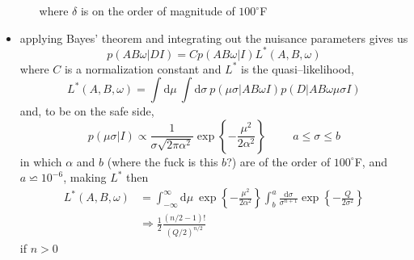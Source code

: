 \documentclass[../jaynes_prob_theory_notes.tex]{subfiles}
\begin{document}
\begin{itemize}
\begin{itemize}
                            where \(\delta\) is on the order of magnitude of \(100^{\circ}\)F
                    \end{itemize}
                \item applying Bayes' theorem and integrating out the nuisance parameters gives us
                    \begin{equation*} 
                        p(AB\omega|DI) = Cp(AB\omega|I)L^*(A, B, \omega)
                    \end{equation*}
                    where \(C\) is a normalization constant and \(L^*\) is the quasi--likelihood,
                    \begin{equation*} 
                        L^* (A,B,\omega) = \int \text{d}\mu~\int \text{d}\sigma~p(\mu\sigma|AB\omega I)p(D|AB\omega\mu\sigma I)
                    \end{equation*}
                    and, to be on the safe side,
                    \begin{equation*} 
                        p(\mu\sigma|I) \propto \frac{1}{\sigma \sqrt{2 \pi \alpha^2}} \exp \left \{ -\frac{\mu^2}{2 \alpha^2} \right \} \hspace{1cm} a \leq \sigma \leq b
                    \end{equation*}
                    in which \(\alpha\) and \(b\) (where the fuck is this \(b\)?) are of the order of \(100^{\circ}\)F, and \(a \backsimeq 10^{-6}\), making \(L^*\) then
                    \begin{align*} 
                        L^*(A,B,\omega) &= \int^{\infty}_{-\infty} \text{d}\mu~\exp \left \{ -\frac{\mu^2}{2\alpha^2} \right \} \int^{a}_{b} \frac{\text{d}\sigma}{\sigma^{n+1}} \exp \left\{ -\frac{Q}{2\sigma^2} \right\} \\
                                        &\Rightarrow \frac{1}{2}\frac{(n/2 - 1)!}{{(Q/2)}^{n/2}}
                    \end{align*}
                    if \(n>0\)
            \end{itemize}
\end{document}

